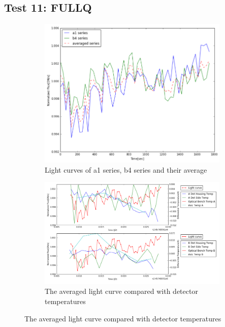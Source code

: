 \documentclass{aastex6}
\begin{document}
\subsection{Test 11: FULLQ} 
\begin{figure}[H]
    \centering
    \begin{subfigure}{1}
        \includegraphics[scale=0.4]{ts_test11}
        \caption{Light curves of a1 series, b4 series and their average}
    \end{subfigure}

    \begin{subfigure}{2}
        \includegraphics[scale=0.4]{temp_test11}
        \caption{The averaged light curve compared with detector temperatures}
    \end{subfigure}
   

\end{figure}
\end{document}
